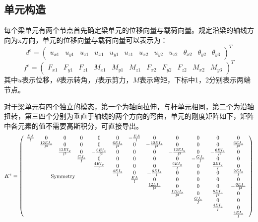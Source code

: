 \documentclass[forprint]{WHUBachelor}
\begin{document}
\subsection{单元构造}
每个梁单元有两个节点首先确定梁单元的位移向量与载荷向量。规定沿梁的轴线方向为x方向，单元的位移向量与载荷向量可以表示为：
\begin{equation} 
d^{e}=\left(\begin{array}{llllllllllll}{u_{x 1}} & {u_{y 1}} & {u_{z 1}} & {u_{x 1}} & {u_{y 1}} & {u_{z 1}} & {u_{x 2}} & {u_{y 2}} & {u_{z 2}} & {\theta_{x 2}} & {\theta_{y 2}} & {\theta_{y 3}}\end{array}\right)^{T}
 \end{equation}
\begin {equation} 
f^{e}=\left(\begin{array}{cccccccccccc}{F_{x 1}} & {F_{y 1}} & {F_{z 1}} & {M_{x 1}} & {M_{y 1}} & {M_{z 1}} & {F_{x 2}} & {F_{y 2}} & {F_{z 2}} & {M_{x 2}} & {M_{y 3}}\end{array}\right)^{T}
 \end {equation}
其中$u$表示位移，$\theta$表示转角，$f$表示剪力，$M$表示弯矩，下标中1，2分别表示两端节点。\par
对于梁单元有四个独立的模态，第一个为轴向拉伸，与杆单元相同，第二个为沿轴扭转，第三四个分别为垂直于轴线的两个方向的弯曲，单元的刚度矩阵如下，矩阵中各元素的值不需要高斯积分，可直接导出。
\begin{equation}
K^e=\left(\begin{array}{cccccccccccc}
   \frac{EA}{l} & 0 & 0 & 0 & 0 & 0 & -\frac{EA}{l} & 0 & 0 & 0 & 0 & 0\\
 & \frac{12EI_z}{l^3} & 0 & 0 & 0 & \frac{6EI_z}{l^2} & 0 & -\frac{12EI_z}{l^3} & 0 & 0 & 0 & \frac{6EI_z}{l^2} \\
 &  & \frac{12EI_y}{l^3} & 0 & -\frac{6EI_z}{l^2} & 0 & 0 & 0 & -\frac{12EI_y}{l^3} & 0 & -\frac{6EI_z}{l^2} & 0 \\
 &  &  & \frac{GJ_z}{I} & 0 & 0 & 0 & 0 & 0 & - \frac{GJ_z}{I} & 0 & 0\\
 &  &  &  & \frac{4EI_y}{l} & 0 & 0 & 0 & \frac{6EI_y}{l} & 0 & \frac{2EI_y}{l} & 0\\
 &  &  &  &  & \frac{4EI_z}{l} & 0 & -\frac{6EI_z}{l} & 0 & 0 & 0 & \frac{2EI_z}{l}\\
 &  \multicolumn{3}{c}{\raisebox{1.3ex}[0pt]{Symmetry}}  &  &  &\frac{EA}{l} & 0 & 0 & 0 & 0 & 0\\
 &  &  &  &  &  &  & \frac{12EI_z}{l^3} & 0 & 0 & 0 & -\frac{6EI_z}{l^2}\\
 &  &  &  &  &  &  &  & \frac{12EI_y}{l^3} & 0 & \frac{6EI_y}{l^2} & 0\\
 &  &  &  &  &  &  &  &  & \frac{GJ_z}{I} & 0 & 0\\
 &  &  &  &  &  &  &  &  &  & \frac{4EI_y}{l} & 0\\
 &  &  &  &  &  &  &  &  &  &  &\frac{4EI_z}{l}\\
\end{array}\right)
\end{equation}
\end{document}
